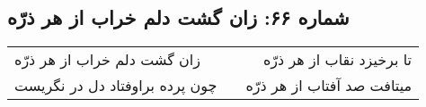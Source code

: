 \begin{center}
\section*{شماره ۶۶: زان گشت دلم خراب از هر ذرّه}
\label{sec:066}
\begin{longtable}{l p{0.5cm} r}
زان گشت دلم خراب از هر ذرّه
&&
تا برخیزد نقاب از هر ذرّه
\\
چون پرده براوفتاد دل در نگریست
&&
میتافت صد آفتاب از هر ذرّه
\\
\end{longtable}
\end{center}
